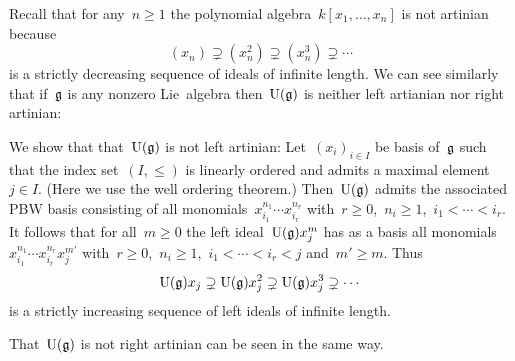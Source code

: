\begin{remark}
  Recall that for any~$n \geq 1$ the polynomial algebra~$k[x_1, \dotsc, x_n]$ is not artinian because
  \[
    (x_n)
    \supsetneq
    (x_n^2)
    \supsetneq
    (x_n^3)
    \supsetneq
    \dotsb
  \]
  is a strictly decreasing sequence of ideals of infinite length.
  We can see similarly that if~$\mathfrak{g}$ is any nonzero Lie~algebra then~$\operatorname{U}(\mathfrak{g})$ is neither left artianian nor right artinian:
  
  We show that that~$\operatorname{U}(\mathfrak{g})$ is not left artinian:
  Let~$(x_i)_{i \in I}$ be basis of~$\mathfrak{g}$ such that the index set~$(I, \leq)$ is linearly ordered and admits a maximal element~$j \in I$.
  (Here we use the well ordering theorem.)
  Then~$\operatorname{U}(\mathfrak{g})$ admits the associated PBW basis consisting of all monomials~$x_{i_1}^{n_1} \dotsm x_{i_r}^{n_r}$ with~$r \geq 0$,~$n_i \geq 1$,~$i_1 < \dotsb < i_r$.
  It follows that for all~$m \geq 0$ the left ideal~$\operatorname{U}(\mathfrak{g}) x_j^m$ has as a basis all monomials~$x_{i_1}^{n_1} \dotsm x_{i_r}^{n_r} x_j^{m'}$ with~$r \geq 0$,~$n_i \geq 1$,~$i_1 < \dotsb < i_r < j$ and~$m' \geq m$.
  Thus
  \[
    \operatorname{U}(\mathfrak{g}) x_j
    \supsetneq
    \operatorname{U}(\mathfrak{g}) x_j^2
    \supsetneq
    \operatorname{U}(\mathfrak{g}) x_j^3
    \supsetneq
    \dotsb
  \]
  is a strictly increasing sequence of left ideals of infinite length.
  
  That~$\operatorname{U}(\mathfrak{g})$ is not right artinian can be seen in the same way.
\end{remark}


